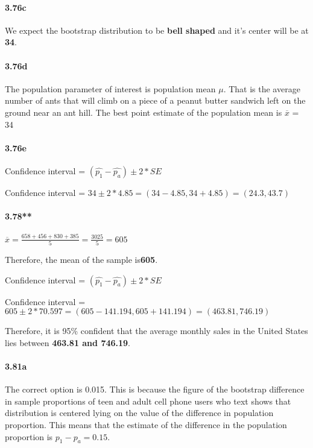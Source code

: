 \documentclass[
]{article}
\begin{document}
\hypertarget{c-8}{%
\paragraph{3.76c}\label{c-8}}

We expect the bootstrap distribution to be \textbf{bell shaped} and it's
center will be at \textbf{34}.

\hypertarget{d-5}{%
\paragraph{3.76d}\label{d-5}}

The population parameter of interest is population mean \(\mu\). That is
the average number of ants that will climb on a piece of a peanut butter
sandwich left on the ground near an ant hill. The best point estimate of
the population mean is \(\overline{x}\) = 34

\hypertarget{e-2}{%
\paragraph{3.76e}\label{e-2}}

Confidence interval = \((\hat{p_1} - \hat{p_a}) \pm 2 *SE\)

Confidence interval = \(34\pm 2*4.85 =(34-4.85,34+4.85) = (24.3,43.7)\)

\hypertarget{section-3}{%
\paragraph{3.78**}\label{section-3}}

\(\overline{x} = \frac{658+456+830+385}{5} = \frac{3025}{5} = 605\)

Therefore, the mean of the sample is\textbf{605}.

Confidence interval = \((\hat{p_1} - \hat{p_a}) \pm 2 *SE\)

Confidence interval =
\(605\pm 2*70.597 =(605-141.194,605+141.194) = (463.81,746.19)\)

Therefore, it is 95\% confident that the average monthly sales in the
United States lies between \textbf{463.81 and 746.19}.

\hypertarget{a-11}{%
\paragraph{3.81a}\label{a-11}}

The correct option is 0.015. This is because the figure of the bootstrap
difference in sample proportions of teen and adult cell phone users who
text shows that distribution is centered lying on the value of the
difference in population proportion. This means that the estimate of the
difference in the population proportion is \(p_1 - p_a = 0.15\).
\end{document}
